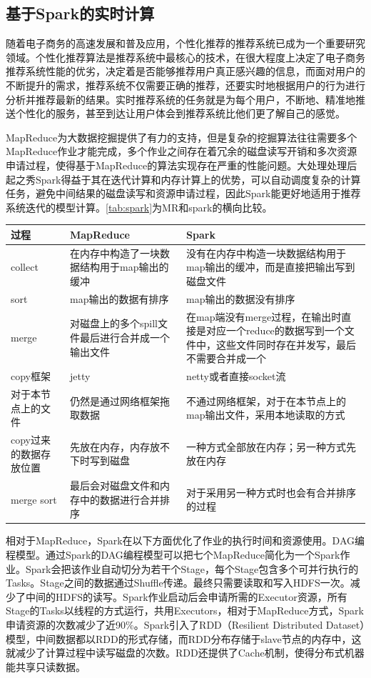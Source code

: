    \subsection{基于Spark的实时计算}
    随着电子商务的高速发展和普及应用，个性化推荐的推荐系统已成为一个重要研究领域。个性化推荐算法是推荐系统中最核心的技术，在很大程度上决定了电子商务推荐系统性能的优劣，决定着是否能够推荐用户真正感兴趣的信息，而面对用户的不断提升的需求，推荐系统不仅需要正确的推荐，还要实时地根据用户的行为进行分析并推荐最新的结果。实时推荐系统的任务就是为每个用户，不断地、精准地推送个性化的服务，甚至到达让用户体会到推荐系统比他们更了解自己的感觉。

    MapReduce为大数据挖掘提供了有力的支持，但是复杂的挖掘算法往往需要多个MapReduce作业才能完成，多个作业之间存在着冗余的磁盘读写开销和多次资源申请过程，使得基于MapReduce的算法实现存在严重的性能问题。大处理处理后起之秀Spark得益于其在迭代计算和内存计算上的优势，可以自动调度复杂的计算任务，避免中间结果的磁盘读写和资源申请过程，因此Spark能更好地适用于推荐系统迭代的模型计算。\autoref{tab:spark}为MR和spark的横向比较。
    \begin{table}[htp]
    \centering
    \label{tab:spark}
    \begin{tabular}{ |p{3cm}|p{5cm}|p{5cm}| } \hline
     过程 & MapReduce & Spark \\ \hline
     collect & 在内存中构造了一块数据结构用于map输出的缓冲 & 没有在内存中构造一块数据结构用于map输出的缓冲，而是直接把输出写到磁盘文件 \\ \hline
     sort & map输出的数据有排序 & map输出的数据没有排序 \\ \hline
     merge & 对磁盘上的多个spill文件最后进行合并成一个输出文件 & 在map端没有merge过程，在输出时直接是对应一个reduce的数据写到一个文件中，这些文件同时存在并发写，最后不需要合并成一个 \\ \hline
     copy框架 & jetty & netty或者直接socket流 \\ \hline
     对于本节点上的文件 & 仍然是通过网络框架拖取数据 & 不通过网络框架，对于在本节点上的map输出文件，采用本地读取的方式\\ \hline
     copy过来的数据存放位置 & 先放在内存，内存放不下时写到磁盘 & 一种方式全部放在内存；另一种方式先放在内存\\ \hline
     merge sort & 最后会对磁盘文件和内存中的数据进行合并排序 & 对于采用另一种方式时也会有合并排序的过程\\ \hline
    \end{tabular}
    \end{table}
    相对于MapReduce，Spark在以下方面优化了作业的执行时间和资源使用。DAG编程模型。通过Spark的DAG编程模型可以把七个MapReduce简化为一个Spark作业。Spark会把该作业自动切分为若干个Stage，每个Stage包含多个可并行执行的Tasks。Stage之间的数据通过Shuffle传递。最终只需要读取和写入HDFS一次。减少了中间的HDFS的读写。Spark作业启动后会申请所需的Executor资源，所有Stage的Tasks以线程的方式运行，共用Executors，相对于MapReduce方式，Spark申请资源的次数减少了近90\%。Spark引入了RDD（Resilient Distributed Dataset）模型，中间数据都以RDD的形式存储，而RDD分布存储于slave节点的内存中，这就减少了计算过程中读写磁盘的次数。RDD还提供了Cache机制，使得分布式机器能共享只读数据。
    
